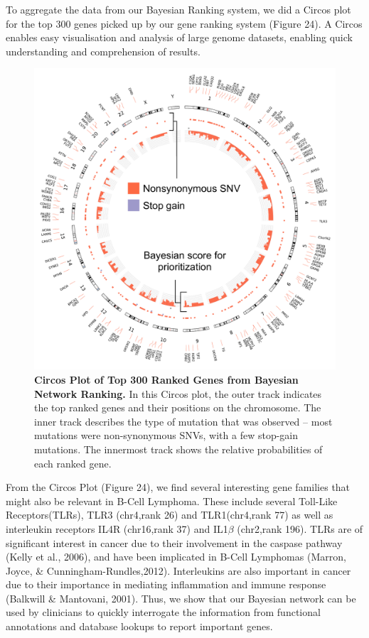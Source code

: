 \documentclass{article}
\begin{document}
To aggregate the data from our Bayesian Ranking system, we did a Circos plot for the top 300 genes picked up by our gene ranking system (Figure 24). A Circos enables easy visualisation and analysis of large genome datasets, enabling quick understanding and comprehension of results. 

\begin{figure}[H]
\includegraphics[width=\textwidth]{circosplot.pdf}
\caption{\textbf{Circos Plot of Top 300 Ranked Genes from Bayesian Network Ranking.} In this Circos plot, the outer track indicates the top ranked genes and their positions on the chromosome. The inner track describes the type of mutation that was observed -- most mutations were non-synonymous SNVs, with a few stop-gain mutations. The innermost track shows the relative probabilities of each ranked gene.}
\centering
\end{figure}

From the Circos Plot (Figure 24), we find several interesting gene families that might also be relevant in B-Cell Lymphoma. These include several Toll-Like Receptors(TLRs), TLR3 (chr4,rank 26) and TLR1(chr4,rank 77) as well as interleukin receptors IL4R (chr16,rank 37) and IL1$\beta$ (chr2,rank 196). TLRs are of significant interest in cancer due to their involvement in the caspase pathway (Kelly et al., 2006), and have been implicated in B-Cell Lymphomas (Marron, Joyce, \& Cunningham-Rundles,2012). Interleukins are also important in cancer due to their importance in mediating inflammation and immune response (Balkwill \& Mantovani, 2001). Thus, we show that our Bayesian network can be used by clinicians to quickly interrogate the information from functional annotations and database lookups to report important genes. 
\end{document}
